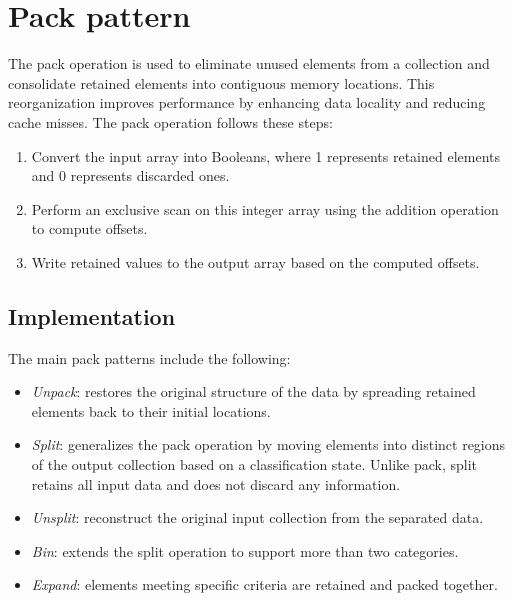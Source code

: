 \section{Pack pattern}

The pack operation is used to eliminate unused elements from a collection and consolidate retained elements into contiguous memory locations. 
This reorganization improves performance by enhancing data locality and reducing cache misses.
The pack operation follows these steps:
\begin{enumerate}
    \item Convert the input array into Booleans, where 1 represents retained elements and 0 represents discarded ones.
    \item Perform an exclusive scan on this integer array using the addition operation to compute offsets.
    \item Write retained values to the output array based on the computed offsets.
\end{enumerate}

\subsection{Implementation}
The main pack patterns include the following:
\begin{itemize}
  \item \textit{Unpack}: restores the original structure of the data by spreading retained elements back to their initial locations. 
  \item \textit{Split}: generalizes the pack operation by moving elements into distinct regions of the output collection based on a classification state.
    Unlike pack, split retains all input data and does not discard any information.
  \item \textit{Unsplit}: reconstruct the original input collection from the separated data. 
  \item \textit{Bin}: extends the split operation to support more than two categories. 
  \item \textit{Expand}: elements meeting specific criteria are retained and packed together.
\end{itemize}